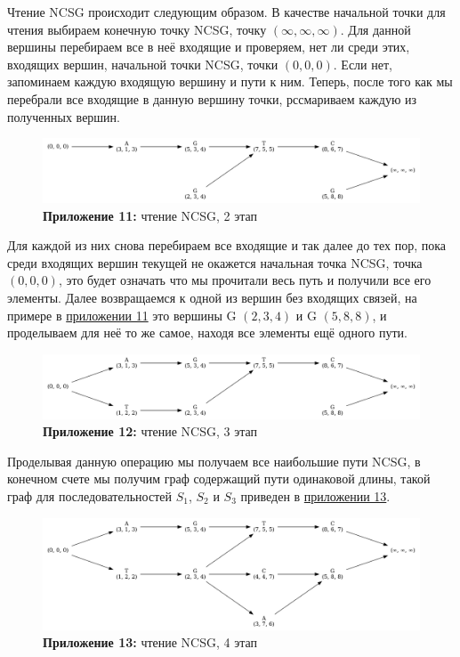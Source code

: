 \documentclass[a4paper,12pt]{extarticle}
\begin{document}
Чтение NCSG происходит следующим образом. В качестве начальной точки для чтения выбираем конечную точку NCSG, точку $(\infty, \infty, \infty)$. Для данной вершины перебираем все в неё входящие и проверяем, нет ли среди этих, входящих вершин, начальной точки NCSG, точки $(0, 0, 0)$. Если нет, запоминаем каждую входящую вершину и пути к ним. Теперь, после того как мы перебрали все входящие в данную вершину точки, рссмариваем каждую из полученных вершин.
\begin{figure}[h!]
  \caption*{\textbf{Приложение 11:} чтение NCSG, 2 этап}
  \label{ncsg:5}
  \includegraphics[width=1\textwidth]{Graph_8.png}
\end{figure}

Для каждой из них снова перебираем все входящие и так далее до тех пор, пока среди входящих вершин текущей не окажется начальная точка NCSG, точка $(0, 0, 0)$, это будет означать что мы прочитали весь путь и получили все его элементы. Далее возвращаемся к одной из вершин без входящих связей, на примере в \hyperref[ncsg:5]{приложении 11} это вершины G $(2, 3, 4)$ и G $(5, 8, 8)$, и проделываем для неё то же самое, находя все элементы ещё одного пути.
\begin{figure}[h!]
  \caption*{\textbf{Приложение 12:} чтение NCSG, 3 этап}
  \includegraphics[width=1\textwidth]{Graph_9.png}
\end{figure}

Проделывая данную операцию мы получаем все наибольшие пути NCSG, в конечном счете мы получим граф содержащий пути одинаковой длины, такой граф для последовательностей $S_{1}$, $S_{2}$ и $S_{3}$ приведен в \hyperref[ncsg:6]{приложении 13}.
\begin{figure}[h!]
  \caption*{\textbf{Приложение 13:} чтение NCSG, 4 этап}
  \label{ncsg:6}
  \includegraphics[width=1\textwidth]{Graph_3.png}
\end{figure}
\end{document}
